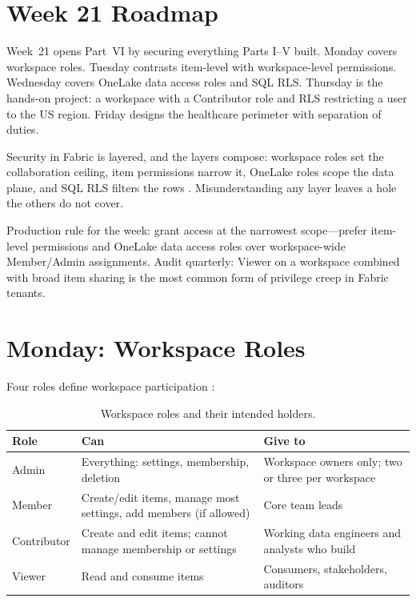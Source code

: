\section{Week 21 Roadmap}
Week~21 opens Part~VI by securing everything Parts I--V built. Monday covers workspace roles. Tuesday contrasts item-level with workspace-level permissions. Wednesday covers OneLake data access roles and SQL RLS. Thursday is the hands-on project: a workspace with a Contributor role and RLS restricting a user to the US region. Friday designs the healthcare perimeter with separation of duties.

Security in Fabric is layered, and the layers compose: workspace roles set the collaboration ceiling, item permissions narrow it, OneLake roles scope the data plane, and SQL RLS filters the rows \cite{microsoftFabricSecurity}. Misunderstanding any layer leaves a hole the others do not cover.

\begin{notebox}
Production rule for the week: grant access at the narrowest scope---prefer item-level permissions and OneLake data access roles over workspace-wide Member/Admin assignments. Audit quarterly: Viewer on a workspace combined with broad item sharing is the most common form of privilege creep in Fabric tenants.
\end{notebox}

\section{Monday: Workspace Roles}
Four roles define workspace participation \cite{microsoftFabricWorkspaces,microsoftFabricSecurity}:

\begin{table}[H]
\centering
\small
\begin{tabular}{@{}p{2.6cm}p{5.8cm}p{5.4cm}@{}}
\toprule
\textbf{Role} & \textbf{Can} & \textbf{Give to} \\
\midrule
Admin & Everything: settings, membership, deletion & Workspace owners only; two or three per workspace \\
Member & Create/edit items, manage most settings, add members (if allowed) & Core team leads \\
Contributor & Create and edit items; cannot manage membership or settings & Working data engineers and analysts who build \\
Viewer & Read and consume items & Consumers, stakeholders, auditors \\
\bottomrule
\end{tabular}
\caption{Workspace roles and their intended holders.}
\label{tab:chapter21-roles}
\end{table}

